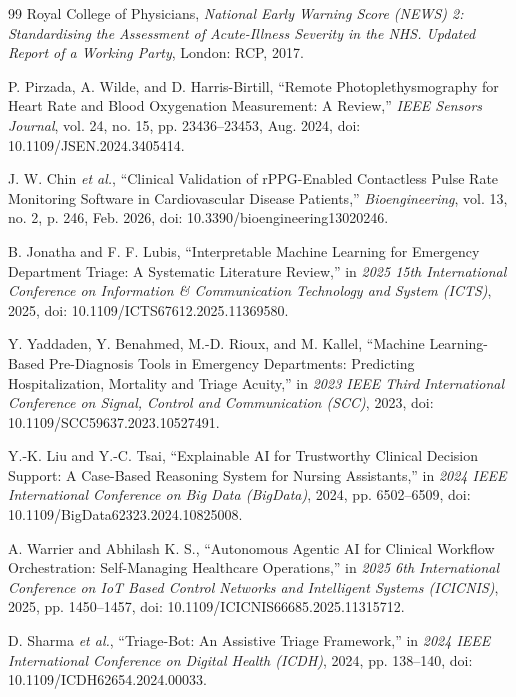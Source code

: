 \documentclass[conference]{IEEEtran}
\begin{document}
\begin{thebibliography}{99}
Royal College of Physicians, \emph{National Early Warning Score (NEWS) 2: Standardising the Assessment of Acute-Illness Severity in the NHS. Updated Report of a Working Party}, London: RCP, 2017.

P. Pirzada, A. Wilde, and D. Harris-Birtill, ``Remote Photoplethysmography for Heart Rate and Blood Oxygenation Measurement: A Review,'' \emph{IEEE Sensors Journal}, vol. 24, no. 15, pp. 23436--23453, Aug. 2024, doi: 10.1109/JSEN.2024.3405414.

J. W. Chin \emph{et al.}, ``Clinical Validation of rPPG-Enabled Contactless Pulse Rate Monitoring Software in Cardiovascular Disease Patients,'' \emph{Bioengineering}, vol. 13, no. 2, p. 246, Feb. 2026, doi: 10.3390/bioengineering13020246.

B. Jonatha and F. F. Lubis, ``Interpretable Machine Learning for Emergency Department Triage: A Systematic Literature Review,'' in \emph{2025 15th International Conference on Information \& Communication Technology and System (ICTS)}, 2025, doi: 10.1109/ICTS67612.2025.11369580.

Y. Yaddaden, Y. Benahmed, M.-D. Rioux, and M. Kallel, ``Machine Learning-Based Pre-Diagnosis Tools in Emergency Departments: Predicting Hospitalization, Mortality and Triage Acuity,'' in \emph{2023 IEEE Third International Conference on Signal, Control and Communication (SCC)}, 2023, doi: 10.1109/SCC59637.2023.10527491.

Y.-K. Liu and Y.-C. Tsai, ``Explainable AI for Trustworthy Clinical Decision Support: A Case-Based Reasoning System for Nursing Assistants,'' in \emph{2024 IEEE International Conference on Big Data (BigData)}, 2024, pp. 6502--6509, doi: 10.1109/BigData62323.2024.10825008.

A. Warrier and Abhilash K. S., ``Autonomous Agentic AI for Clinical Workflow Orchestration: Self-Managing Healthcare Operations,'' in \emph{2025 6th International Conference on IoT Based Control Networks and Intelligent Systems (ICICNIS)}, 2025, pp. 1450--1457, doi: 10.1109/ICICNIS66685.2025.11315712.

D. Sharma \emph{et al.}, ``Triage-Bot: An Assistive Triage Framework,'' in \emph{2024 IEEE International Conference on Digital Health (ICDH)}, 2024, pp. 138--140, doi: 10.1109/ICDH62654.2024.00033.

\end{thebibliography}
\end{document}
